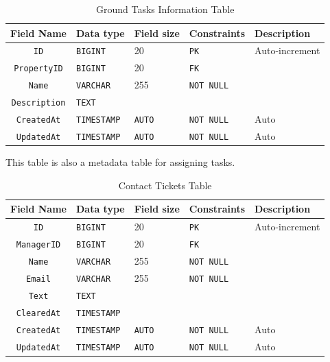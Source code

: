\begin{table}[H]
	\centering
	\begin{tabular}{cllll}
		\hline
		Field Name & Data type & Field size & Constraints & Description \\ \hline
		\texttt{ID} & \texttt{BIGINT} & 20 & \texttt{PK} & Auto-increment \\
		\texttt{PropertyID} & \texttt{BIGINT} & 20 & \texttt{FK} &  \\
		\texttt{Name} & \texttt{VARCHAR} & 255 & \texttt{NOT NULL} &  \\
		\texttt{Description} & \texttt{TEXT} &  & \texttt{} &  \\

		\texttt{CreatedAt} & \texttt{TIMESTAMP} & \texttt{AUTO} & \texttt{NOT NULL} & Auto \\
		\texttt{UpdatedAt} & \texttt{TIMESTAMP} & \texttt{AUTO} & \texttt{NOT NULL} & Auto \\
		\hline
	\end{tabular}
	\caption{Ground Tasks Information Table}
\end{table}

This table is also a metadata table for assigning tasks.

\begin{table}[H]
	\centering
	\begin{tabular}{cllll}
		\hline
		Field Name & Data type & Field size & Constraints & Description \\ \hline
		\texttt{ID} & \texttt{BIGINT} & 20 & \texttt{PK} & Auto-increment \\
		\texttt{ManagerID} & \texttt{BIGINT} & 20 & \texttt{FK} &  \\
		\texttt{Name} & \texttt{VARCHAR} & 255 & \texttt{NOT NULL} &  \\
		\texttt{Email} & \texttt{VARCHAR} & 255 & \texttt{NOT NULL} &  \\
		\texttt{Text} & \texttt{TEXT} &  & \texttt{} &  \\
		\texttt{ClearedAt} & \texttt{TIMESTAMP} & & &  \\

		\texttt{CreatedAt} & \texttt{TIMESTAMP} & \texttt{AUTO} & \texttt{NOT NULL} & Auto \\
		\texttt{UpdatedAt} & \texttt{TIMESTAMP} & \texttt{AUTO} & \texttt{NOT NULL} & Auto \\
		\hline
	\end{tabular}
	\caption{Contact Tickets Table}
\end{table}

\clearpage
